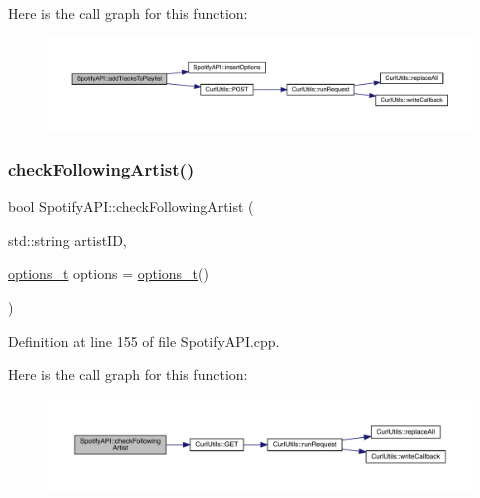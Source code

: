 Here is the call graph for this function\+:
\nopagebreak
\begin{figure}[H]
\begin{center}
\leavevmode
\includegraphics[width=350pt]{class_spotify_a_p_i_a045a3f9378e1fe18372e38ad58f86c91_cgraph}
\end{center}
\end{figure}
\mbox{\label{class_spotify_a_p_i_a87a0c994f9f8349bc59db853224e33af}} 
\subsubsection{\texorpdfstring{check\+Following\+Artist()}{checkFollowingArtist()}}
{\footnotesize\ttfamily bool Spotify\+A\+P\+I\+::check\+Following\+Artist (\begin{DoxyParamCaption}\item[{std\+::string}]{artist\+ID,  }\item[{\mbox{\hyperlink{_spotify_a_p_i_8h_a0ff5cac1a4007bb330b7d9939650c283}{options\+\_\+t}}}]{options = {\ttfamily \mbox{\hyperlink{_spotify_a_p_i_8h_a0ff5cac1a4007bb330b7d9939650c283}{options\+\_\+t}}()} }\end{DoxyParamCaption})}



Definition at line 155 of file Spotify\+A\+P\+I.\+cpp.

Here is the call graph for this function\+:
\nopagebreak
\begin{figure}[H]
\begin{center}
\leavevmode
\includegraphics[width=350pt]{class_spotify_a_p_i_a87a0c994f9f8349bc59db853224e33af_cgraph}
\end{center}
\end{figure}
\mbox{\label{class_spotify_a_p_i_a05fc84c40326e8fed074dd640bc518fc}} 
